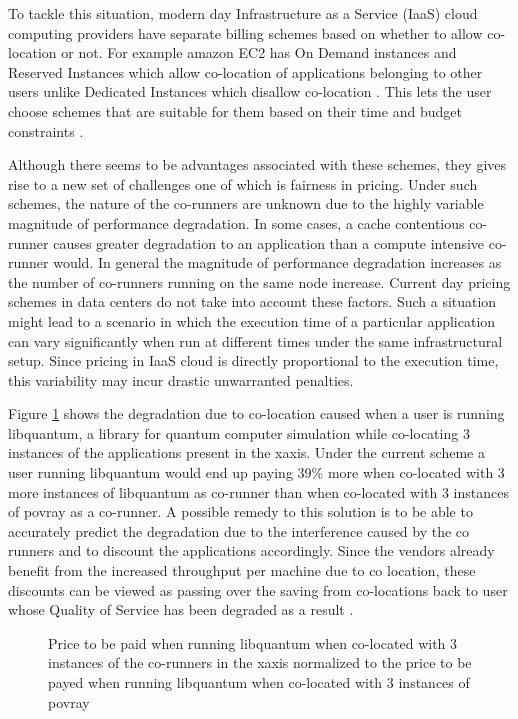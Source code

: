 \documentclass[pageno]{jpaper}
\begin{document}
To tackle this situation, modern day Infrastructure as a Service (IaaS) cloud computing providers have separate billing schemes based on whether to allow co-location or not. For example amazon EC2 has On Demand instances and Reserved Instances which allow co-location of applications belonging to other users unlike Dedicated Instances which disallow co-location \cite{amazon}. This lets the user choose schemes that are suitable for them based on their time and budget constraints \cite{6133267} \cite{5279594} \cite{Farley:2012:MYM:2391229.2391249}.

Although there seems to be advantages associated with these schemes, they gives rise to a new set of challenges one of which is fairness in pricing. Under such schemes, the nature of the co-runners are unknown due to the highly variable magnitude of performance degradation. In some cases, a cache contentious co-runner causes greater degradation to an application than a compute intensive co-runner would. In general the magnitude of performance degradation increases as the number of co-runners running on the same node increase. Current day pricing schemes in data centers do not take into account these factors. Such a situation might lead to a scenario in which the execution time of a particular application can vary significantly when run at different times under the same infrastructural setup. Since pricing in IaaS cloud is directly proportional to the execution time, this variability may incur drastic unwarranted penalties.

Figure \ref{fig:comparecorun} shows the degradation due to co-location caused when a user is running  libquantum, a library for quantum computer simulation while co-locating 3 instances of the applications present in the xaxis. Under the current scheme a user running libquantum would end up paying 39\% more when co-located with 3 more instances of libquantum as co-runner than when co-located with 3 instances of povray as a co-runner.   A possible remedy to this solution is to be able to accurately predict the degradation due to the interference caused by the co runners and to discount the applications accordingly. Since the vendors already benefit from the increased throughput per machine due to co location, these discounts can be viewed as passing over the saving from co-locations back to user whose Quality of Service has been degraded as a result \cite{reqos} \cite{mars13isca} \cite{DBLP:journals/corr/abs-0909-1784}.
\begin{figure}
\centering
\begin{minipage}[t]{1\columnwidth}
\centering
{}
\caption{Price to be paid when running libquantum when co-located with 3 instances of the co-runners in the xaxis normalized to the price to be payed when running libquantum when co-located with 3 instances of povray}
\label{fig:comparecorun}
\end{minipage}
\end{figure}
\end{document}
